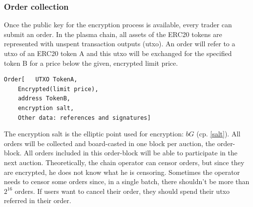 \documentclass[11pt,parskip=full]{scrartcl}%
\begin{document}
\subsubsection{Order collection}
\label{orderblock}
Once the public key for the encryption process is available, every trader can submit an order. In the plasma chain, all assets of the ERC20 tokens are represented with unspent transaction outputs (utxo). An order will refer to a utxo of an ERC20 token A and this utxo will be exchanged for the specified token B for a price below the given, encrypted limit price.
\begin{lstlisting}
Order[   UTXO TokenA,
	Encrypted(limit price),
	address TokenB,
	encryption salt,
	Other data: references and signatures]
\end{lstlisting} 
The encryption salt is the elliptic point used for encryption:  $bG$ (cp. \ref{salt}).
All orders will be collected and board-casted in one block per auction, the order-block. All orders included in this order-block will be able to participate in the next auction. Theoretically, the chain operator can censor orders, but since they are encrypted, he does not know what he is censoring. Sometimes the operator needs to censor some orders since, in a single batch, there shouldn't be more than $2^{16}$ orders.  If users want to cancel their order, they should spend their utxo referred in their order.
\end{document}
